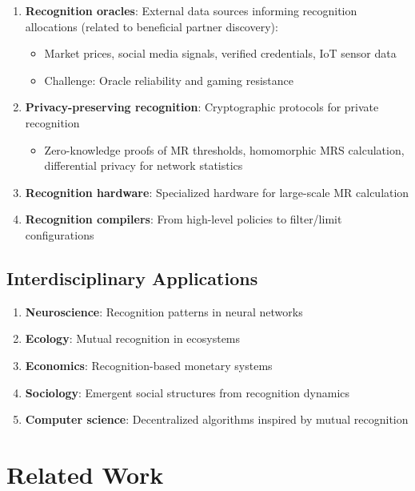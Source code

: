 \documentclass[11pt,a4paper]{article}
\theoremstyle{definition}
\theoremstyle{remark}
\begin{document}
\begin{enumerate}
\textbf{Research directions}: Optimal onboarding curves, prevention of onboarding gaming, scalable discovery mechanisms, cross-network portability of recognition.

\item \textbf{Recognition oracles}: External data sources informing recognition allocations (related to beneficial partner discovery):
\begin{itemize}
\item Market prices, social media signals, verified credentials, IoT sensor data
\item Challenge: Oracle reliability and gaming resistance
\end{itemize}

\item \textbf{Privacy-preserving recognition}: Cryptographic protocols for private recognition
\begin{itemize}
\item Zero-knowledge proofs of MR thresholds, homomorphic MRS calculation, differential privacy for network statistics
\end{itemize}

\item \textbf{Recognition hardware}: Specialized hardware for large-scale MR calculation

\item \textbf{Recognition compilers}: From high-level policies to filter/limit configurations
\end{enumerate}

\subsection{Interdisciplinary Applications}

\begin{enumerate}
\item \textbf{Neuroscience}: Recognition patterns in neural networks
\item \textbf{Ecology}: Mutual recognition in ecosystems
\item \textbf{Economics}: Recognition-based monetary systems
\item \textbf{Sociology}: Emergent social structures from recognition dynamics
\item \textbf{Computer science}: Decentralized algorithms inspired by mutual recognition
\end{enumerate}

\section{Related Work}
\end{document}
